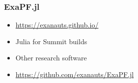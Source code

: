 

\begin{frame}[fragile]
  \frametitle{ExaPF.jl}
  \begin{itemize}
    \item \url{https://exanauts.github.io/}
    \item Julia for Summit builds
    \item Other research software
    \item \url{https://github.com/exanauts/ExaPF.jl}
  \end{itemize}
\end{frame}

